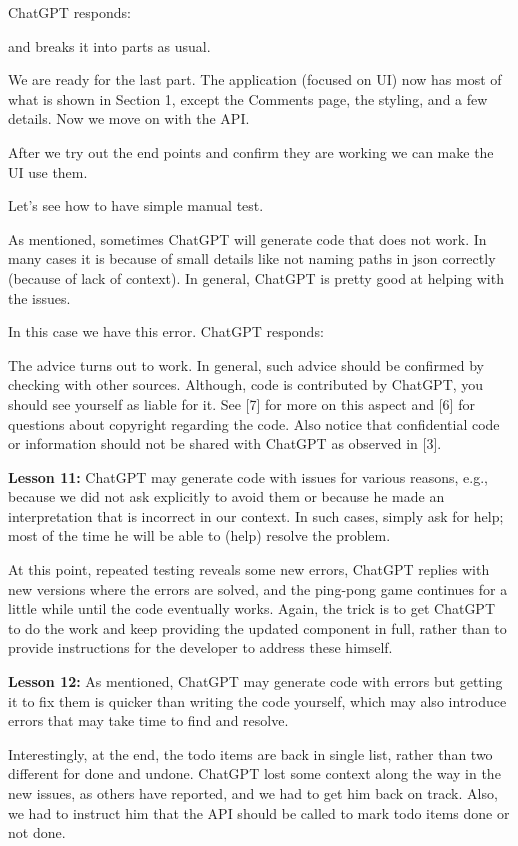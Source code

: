 \documentclass[runningheads]{llncs}
\begin{document}
ChatGPT responds:

and breaks it into parts as usual.
  
We are ready for the last part. The application (focused on UI) now has most of what is shown in Section 1, except the Comments page, the
styling, and a few details. Now we move on with the API.
    
After we try out the end points and confirm they are working we can make the UI use them.

Let's see how to have simple manual test.
  
As mentioned, sometimes ChatGPT will generate code that does not work. In many cases it is because of small details like not naming paths in json correctly (because of lack of context). In general, ChatGPT is pretty good at helping with the issues.

In this case we have this error. ChatGPT responds:

The advice turns out to work. In general, such advice should be confirmed by checking with other sources. Although, code is contributed by ChatGPT, you should see yourself as liable for it. See [7] for more on this aspect and [6] for questions about copyright regarding the code. Also notice that confidential code or information should not be shared with ChatGPT as observed in [3].
  
\textbf{Lesson 11:} ChatGPT may generate code with issues for various reasons, e.g., because we did not ask explicitly to avoid them or because he made an interpretation that is incorrect in our context. In such cases, simply ask for help; most of the time he will be able to (help) resolve the problem.

At this point, repeated testing reveals some new errors, ChatGPT replies with new versions where the errors are solved, and the ping-pong game continues for a little while until the code eventually works. Again, the trick is to get ChatGPT to do the work and keep providing the updated component in full, rather than to provide instructions for the developer to address these himself.

\textbf{Lesson 12:} As mentioned, ChatGPT may generate code with errors but getting it to fix them is quicker than writing the code yourself, which may also introduce errors that may take time to find and resolve.

Interestingly, at the end, the todo items are back in single list, rather than two different for done and undone. ChatGPT lost some context along the way in the new issues, as others have reported, and we had to get him back on track. Also, we had to instruct him that the API should be called to mark todo items done or not done.
\end{document}
